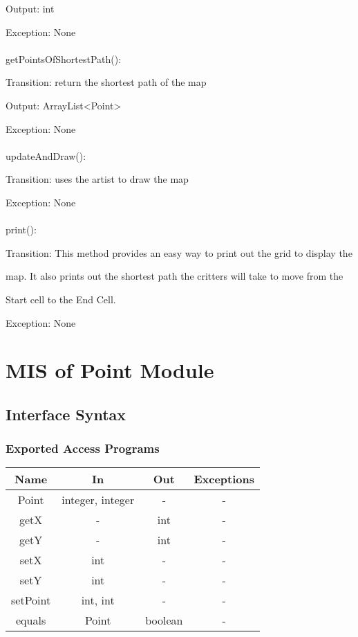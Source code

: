 \documentclass[12,english]{article}
\begin{document}
		Output: int
		
		Exception: None\\
		\\
		getPointsOfShortestPath():

		Transition: return the shortest path of the map
		
		Output: ArrayList<Point>
		
		Exception: None\\
		\\
		updateAndDraw():

		Transition: uses the artist to draw the map
		
		Exception: None\\
		\\
		print():
		
		Transition: This method provides an easy way to print out the grid to display the
		
		map. It also prints out the shortest path the critters will take to move from the
		
		Start cell to the End Cell.
		
		Exception: None

\section{MIS of Point Module}
		\subsection{Interface Syntax}
			\subsubsection{Exported Access Programs}
				\begin{tabular}[pos]{|c|c|c|c|}
					
					\hline
					\textbf{Name}& \textbf{In} & \textbf{Out} & \textbf{Exceptions} \\ \hline
					Point & integer, integer & - & -\\ \hline
					getX & - & int & -\\ \hline
					getY & - & int & -\\ \hline
					setX & int & - & -\\ \hline
					setY & int & - & -\\ \hline
					setPoint & int, int & - & - \\ \hline
					equals & Point & boolean & - \\ \hline
					
				\end{tabular}
				
\end{document}
